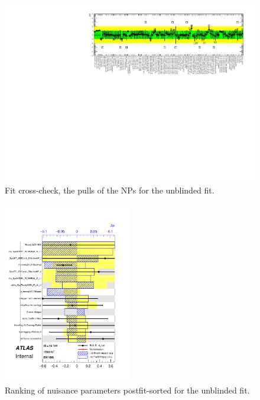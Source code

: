 \begin{figure}[ht]
      \centering
        \includegraphics[width=\linewidth]{figures/Fit_fcc/GlobalFit/NP_allExceptGammas.pdf}
        \caption{Fit cross-check, the pulls of the NPs for the unblinded fit.}
       \label{fig:fit_1lep_fcc_data}
\end{figure}

\begin{figure}[ht]
      \centering
        \includegraphics[width=0.5\textwidth]{figures/Fit_np_rank/pulls_mu_Global/pulls_mu_SemileptonicVBS_5.pdf}
        \caption{Ranking of nuisance parameters postfit-sorted for the unblinded fit.}
       \label{fig:fit_1lep_ranking_all_data}
\end{figure}



%



